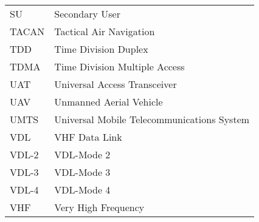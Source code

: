 \begin{tabular}{ll}
SU	& Secondary User\\
TACAN	& Tactical Air Navigation \\
TDD	& Time Division Duplex\\
TDMA	& Time Division Multiple Access\\
UAT	& Universal Access Transceiver \\
UAV	& Unmanned Aerial Vehicle\\
UMTS & Universal Mobile Telecommunications System\\
VDL	& VHF Data Link\\
VDL-2	& VDL-Mode 2\\
VDL-3	& VDL-Mode 3\\
VDL-4	& VDL-Mode 4\\
VHF	& Very High Frequency\\

\end{tabular}


